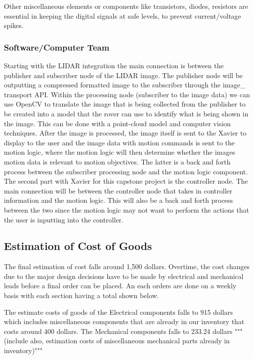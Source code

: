 \documentclass[a4paper, 10pt]{article}
\begin{document}
		Other miscellaneous elements or components like transistors, diodes, resistors are essential in keeping the digital signals at safe levels, to prevent current/voltage spikes.
		

		\subsubsection{Software/Computer Team}
	Starting with the LIDAR integration the main connection is between the publisher and subscriber node of the LIDAR image. The publisher node will be outputting a compressed formatted image to the subscriber through the image\_ transport API. Within the processing node (subscriber to the image data) we can use OpenCV to translate the image that is being collected from the publisher to be created into a model that the rover can use to identify what is being shown in the image. This can be done with a point-cloud model and computer vision techniques. After the image is processed, the image itself is sent to the Xavier to display to the user and the image data with motion commands is sent to the motion logic, where the motion logic will then determine whether the images motion data is relevant to motion objectives. The latter is a back and forth process between the subscriber processing node and the motion logic component. 
The second part with Xavier for this capstone project is the controller node. The main connection will be between the controller node that takes in controller information and the motion logic. This will also be a back and forth process between the two since the motion logic may not want to perform the actions that the user is inputting into the controller. 

	\subsection{Estimation of Cost of Goods}
	The final estimation of cost falls around 1,500 dollars. Overtime, the cost changes due to the major design decisions have to be made by electrical and mechanical leads before a final order can be placed. An each orders are done on a weekly basis with each section having a total shown below. 
	
	The estimate costs of goods of the Electrical components falls to 915 dollars which includes miscellaneous components that are already in our inventory that costs around 400 dollars. The Mechanical components falls to 233.24 dollars """(include also, estimation costs of miscellaneous mechanical parts already in inventory)"""
\end{document}
